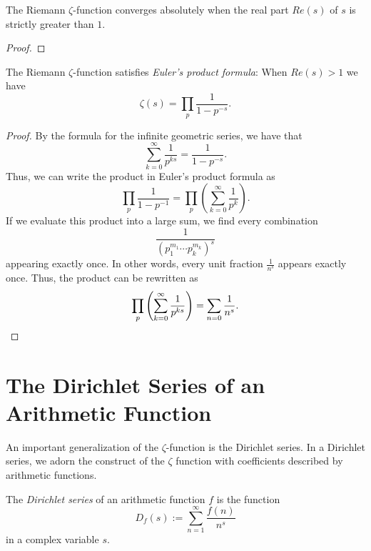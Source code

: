 \begin{theorem}
  The Riemann $\zeta$-function converges absolutely when the real part $Re(s)$ of $s$ is strictly greater than $1$.
\end{theorem}

\begin{proof}
  
\end{proof}

\begin{theorem}
  The Riemann $\zeta$-function satisfies \emph{Euler's product formula}: When $Re(s)>1$ we have
  \begin{equation*}
    \zeta(s)=\prod_{p}\frac{1}{1-p^{-s}}.
  \end{equation*}
\end{theorem}

\begin{proof}
  By the formula for the infinite geometric series, we have that
  \begin{equation*}
    \sum_{k=0}^\infty \frac{1}{p^{ks}}=\frac{1}{1-p^{-s}}.
  \end{equation*}
  Thus, we can write the product in Euler's product formula as
  \begin{equation*}
    \prod_p\frac{1}{1-p^{-1}}=\prod_p\left(\sum_{k=0}^\infty\frac{1}{p^k}\right).
  \end{equation*}
  If we evaluate this product into a large sum, we find every combination
  \begin{equation*}
    \frac{1}{(p_1^{m_1}\cdots p_k^{m_k})^s}
  \end{equation*}
  appearing exactly once. In other words, every unit fraction $\frac{1}{n^s}$ appears exactly once. Thus, the product can be rewritten as
  \begin{equation*}
    \prod_p\left(\sum_{k=0}^\infty\frac{1}{p^{ks}}\right)=\sum_{n=0}\frac{1}{n^s}.\qedhere
  \end{equation*}
\end{proof}

\section{The Dirichlet Series of an Arithmetic Function}

An important generalization of the $\zeta$-function is the Dirichlet series. In a Dirichlet series, we adorn the construct of the $\zeta$ function with coefficients described by arithmetic functions. 

\begin{definition}
  The \emph{Dirichlet series} of an arithmetic function $f$ is the function
  \begin{equation*}
    D_f(s):=\sum_{n=1}^\infty\frac{f(n)}{n^s}
  \end{equation*}
  in a complex variable $s$.
\end{definition}

